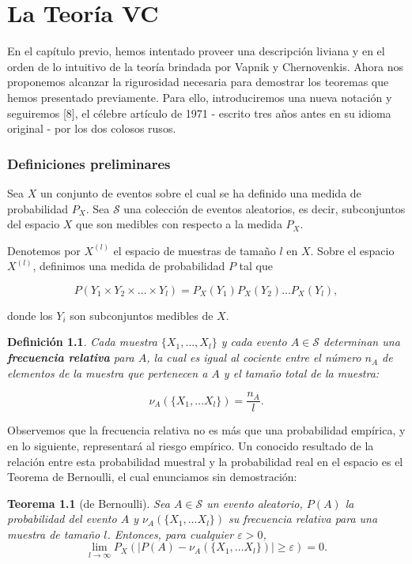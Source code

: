 \documentclass{report}
\newtheorem{thm}{Teorema}[section]
\newtheorem{dfn}{Definición}[section]
\begin{document}
\chapter{La Teoría VC}

En el capítulo previo, hemos intentado proveer una descripción liviana y en el orden de lo intuitivo de la teoría brindada por 
Vapnik y Chernovenkis. Ahora nos proponemos alcanzar la rigurosidad necesaria para demostrar los teoremas que hemos presentado 
previamente. Para ello, introduciremos una nueva notación y seguiremos [8], el célebre artículo de 1971 - escrito tres años antes en su 
idioma original - por los dos colosos rusos.\newline

\subsection{Definiciones preliminares}

Sea \( X \) un conjunto de eventos sobre el cual se ha definido una medida de probabilidad \( P_X \). Sea \( \mathcal{S} \) una colección de eventos 
aleatorios, es decir, subconjuntos del espacio \( X \) que son medibles con respecto 
a la medida \( P_X \). \newline

Denotemos por \( X^{(l)} \) el espacio de muestras de tamaño \( l \) en \( X \). 
Sobre el espacio \( X^{(l)} \), definimos una medida de probabilidad \( P \) tal que

\begin{equation}\label{def: probabilidad en espacio muestral}
P(Y_1\times Y_2 \times\dots\times Y_l) = P_X(Y_1) P_X(Y_2) \dots P_X(Y_l),
\end{equation}

donde los \( Y_i \) son subconjuntos medibles de \( X \).\newline

\begin{dfn}
Cada muestra \( \{X_1, \dots, X_l\} \) y cada evento \( A \in \mathcal{S} \) determinan 
una \textbf{frecuencia relativa} para \( A \), la cual es igual al cociente entre 
el número \( n_A \) de elementos de la muestra que pertenecen a \( A \) y el tamaño 
total de la muestra:

\[
\nu_A(\{X_1,\dots X_l\}) = \frac{n_A}{l}.
\]

\end{dfn}

Observemos que la frecuencia relativa no es más que una probabilidad empírica, y en lo siguiente, representará al riesgo
empírico. Un conocido resultado de la relación entre esta probabilidad muestral y la probabilidad real en el espacio
es el Teorema de Bernoulli, el cual enunciamos sin demostración:
\bigskip
\begin{thm}[de Bernoulli]
Sea \( A \in \mathcal{S} \) un evento aleatorio, $P(A)$ la probabilidad del evento $A$ y $\nu_A(\{X_1,\dots X_l\})$ su frecuencia relativa para una muestra de
tamaño $l$. Entonces, para cualquier $\varepsilon > 0$,
\[
    \lim_{l\to\infty} P_X\left(| P(A)-\nu_A(\{X_1,\dots X_l\})| \geq \varepsilon\right) = 0.
\]
\end{thm}
\end{document}
